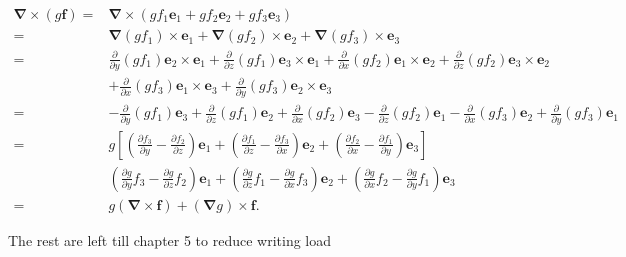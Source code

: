 \begin{formalproof}
\begin{itemize}
\[
\begin{aligned}
\boldsymbol{\nabla} \times(g \boldsymbol{f})= & \boldsymbol{\nabla} \times\left(g f_1 \boldsymbol{e}_1+g f_2 \boldsymbol{e}_2+g f_3 \boldsymbol{e}_3\right) \\
= & \boldsymbol{\nabla}\left(g f_1\right) \times \boldsymbol{e}_1+\boldsymbol{\nabla}\left(g f_2\right) \times \boldsymbol{e}_2+\boldsymbol{\nabla}\left(g f_3\right) \times \boldsymbol{e}_3 \\
= & \frac{\partial}{\partial y}\left(g f_1\right) \boldsymbol{e}_2 \times \boldsymbol{e}_1+\frac{\partial}{\partial z}\left(g f_1\right) \boldsymbol{e}_3 \times \boldsymbol{e}_1+\frac{\partial}{\partial x}\left(g f_2\right) \boldsymbol{e}_1 \times \boldsymbol{e}_2+\frac{\partial}{\partial z}\left(g f_2\right) \boldsymbol{e}_3 \times \boldsymbol{e}_2 \\
& +\frac{\partial}{\partial x}\left(g f_3\right) \boldsymbol{e}_1 \times \boldsymbol{e}_3+\frac{\partial}{\partial y}\left(g f_3\right) \boldsymbol{e}_2 \times \boldsymbol{e}_3 \\
= & -\frac{\partial}{\partial y}\left(g f_1\right) \boldsymbol{e}_3+\frac{\partial}{\partial z}\left(g f_1\right) \boldsymbol{e}_2+\frac{\partial}{\partial x}\left(g f_2\right) \boldsymbol{e}_3-\frac{\partial}{\partial z}\left(g f_2\right) \boldsymbol{e}_1-\frac{\partial}{\partial x}\left(g f_3\right) \boldsymbol{e}_2+\frac{\partial}{\partial y}\left(g f_3\right) \boldsymbol{e}_1 \\
= & g\left[\left(\frac{\partial f_3}{\partial y}-\frac{\partial f_2}{\partial z}\right) \boldsymbol{e}_1+\left(\frac{\partial f_1}{\partial z}-\frac{\partial f_3}{\partial x}\right) \boldsymbol{e}_2+\left(\frac{\partial f_2}{\partial x}-\frac{\partial f_1}{\partial y}\right) \boldsymbol{e}_3\right] \\
& \left(\frac{\partial g}{\partial y} f_3-\frac{\partial g}{\partial z} f_2\right) \boldsymbol{e}_1+\left(\frac{\partial g}{\partial z} f_1-\frac{\partial g}{\partial x} f_3\right) \boldsymbol{e}_2+\left(\frac{\partial g}{\partial x} f_2-\frac{\partial g}{\partial y} f_1\right) \boldsymbol{e}_3 \\
= & g(\boldsymbol{\nabla} \times \boldsymbol{f})+(\boldsymbol{\nabla} g) \times \boldsymbol{f} .
\end{aligned}
\]

\end{itemize}

The rest are left till chapter 5 to reduce writing load

\end{formalproof}

